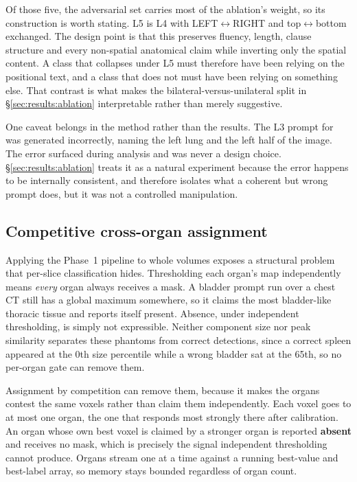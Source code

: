 Of those five, the adversarial set carries most of the ablation's weight, so its
construction is worth stating. L5 is L4 with
LEFT$\leftrightarrow$RIGHT and top$\leftrightarrow$bottom exchanged. The design
point is that this preserves fluency, length, clause structure and every
non-spatial anatomical claim while inverting only the spatial content. A class
that collapses under L5 must
therefore have been relying on the positional text, and a class that does not
must have been relying on something else. That contrast is what makes the
bilateral-versus-unilateral split in \S\ref{sec:results:ablation} interpretable
rather than merely suggestive.

One caveat belongs in the method rather than the results. The L3 prompt for
 was generated incorrectly, naming the left lung and the left
half of the image. The error surfaced during analysis and was never a design
choice. \S\ref{sec:results:ablation} treats it as a natural experiment because
the error happens to be internally consistent, and therefore isolates what a
coherent but wrong prompt does, but it was not a controlled manipulation.

\subsection{Competitive cross-organ assignment}
\label{sec:methods:assign}

Applying the Phase~1 pipeline to whole volumes exposes a structural problem that
per-slice classification hides. Thresholding each organ's map independently
means \emph{every} organ always receives a mask. A bladder prompt run over a
chest CT still has a global maximum somewhere, so it claims the most
bladder-like thoracic tissue and reports itself present. Absence, under
independent thresholding, is simply not expressible. Neither component size nor
peak similarity separates these phantoms from correct
detections, since a correct spleen appeared at the
0th size percentile while a wrong bladder sat at the 65th, so no per-organ gate
can remove them.

Assignment by competition can remove them, because it makes the organs contest
the same voxels rather than claim them independently. Each voxel goes to at most
one organ, the one that responds most strongly there after calibration. An
organ whose own best voxel is claimed by a stronger organ is reported
\textbf{absent} and receives no mask, which is precisely the signal independent
thresholding cannot produce. Organs stream one at a time against a running
best-value and best-label array, so memory stays bounded regardless of organ
count.

